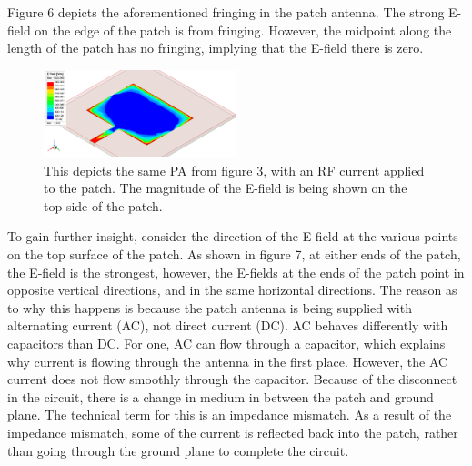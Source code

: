 \documentclass[12pt]{article}
\begin{document}
Figure 6 depicts the aforementioned fringing in the patch antenna. The strong E-field on the edge of the patch is from fringing. However, the midpoint along the length of the patch has no fringing, implying that the E-field there is zero.

\begin{figure}[h]
    \centering
    \includegraphics[width=0.5\textwidth]{basic-patch-antenna-MagE-on-patch.png}
    \caption{This depicts the same PA from figure 3, with an RF current applied to the patch. The magnitude of the E-field is being shown on the top side of the patch.}
\end{figure}

To gain further insight, consider the direction of the E-field at the various points on the top surface of the patch. As shown in figure 7, at either ends of the patch, the E-field is the strongest, however, the E-fields at the ends of the patch point in opposite vertical directions, and in the same horizontal directions. The reason as to why this happens is because the patch antenna is being supplied with alternating current (AC), not direct current (DC). AC behaves differently with capacitors than DC. For one, AC can flow through a capacitor, which explains why current is flowing through the antenna in the first place. However, the AC current does not flow smoothly through the capacitor. Because of the disconnect in the circuit, there is a change in medium in between the patch and ground plane. The technical term for this is an impedance mismatch. As a result of the impedance mismatch, some of the current is reflected back into the patch, rather than going through the ground plane to complete the circuit. 
\end{document}
